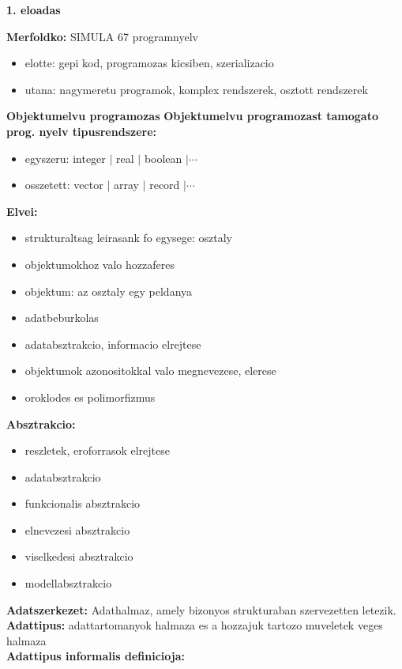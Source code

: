 \documentclass[a4paper,10pt]{article}
\begin{document}
\large
%
%
\begin{flushleft}
\textbf{1. eloadas}
\end{flushleft}
\textbf{Merfoldko:} SIMULA 67 programnyelv
\begin{itemize}
\item elotte: gepi kod, programozas kicsiben, szerializacio
\item utana: nagymeretu programok, komplex rendszerek, osztott rendszerek
\end{itemize}
\textbf{Objektumelvu programozas}%
\textbf{Objektumelvu programozast tamogato prog. nyelv tipusrendszere:}
\begin{itemize}
\item egyszeru: integer $\vert$ real $\vert$ boolean $\vert\cdots$
\item osszetett: vector $\vert$ array $\vert$ record $\vert\cdots$
\end{itemize}
\textbf{Elvei:}
\begin{itemize}
\item strukturaltsag leirasank fo egysege: osztaly
\item objektumokhoz valo hozzaferes
\item objektum: az osztaly egy peldanya
\item adatbeburkolas
\item adatabsztrakcio, informacio elrejtese
\item objektumok azonositokkal valo megnevezese, elerese
\item oroklodes es polimorfizmus
\end{itemize}
\textbf{Absztrakcio:}
\begin{itemize}
\item reszletek, eroforrasok elrejtese
\item adatabsztrakcio
\item funkcionalis absztrakcio 
\item elnevezesi absztrakcio
\item viselkedesi absztrakcio
\item modellabsztrakcio
\end{itemize}
\textbf{Adatszerkezet:} Adathalmaz, amely bizonyos strukturaban szervezetten letezik.\\
\textbf{Adattipus:} adattartomanyok halmaza es a hozzajuk tartozo muveletek veges halmaza\\
\textbf{Adattipus informalis definicioja:}
\end{document}
